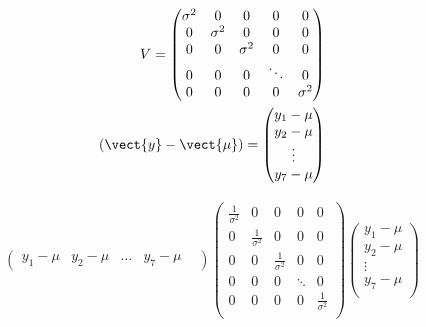 \documentclass[12pt,letterpaper,oneside]{article}\usepackage{graphicx, color}
\begin{document}

\begin{align*}
V=\begin{pmatrix}
    \sigma^{2} & 0 & 0 & 0      & 0\\
    0 & \sigma^{2} & 0 & 0      & 0\\
    0 & 0 & \sigma^{2} & 0      & 0\\
    0 & 0 & 0          & \ddots & 0\\
    0 & 0 & 0          &      0 & \sigma^{2}\\
\end{pmatrix}\\
(\vect{y}-\vect{\mu}) =
\begin{pmatrix}
    y_{1} -\mu\\
    y_{2} -\mu\\
    \vdots\\
    y_{7} -\mu\\
\end{pmatrix}\\
\end{align*}

\begin{align*}
    \begin{pmatrix}
    y_{1} -\mu &
    y_{2} -\mu &
    \ldots &
    y_{7} -\mu &
\end{pmatrix}
\begin{pmatrix}
    \frac{1}{\sigma^{2}} & 0 & 0 & 0      & 0\\
    0 & \frac{1}{\sigma^{2}} & 0 & 0      & 0\\
    0 & 0 & \frac{1}{\sigma^{2}} & 0      & 0\\
    0 & 0 & 0          & \ddots & 0\\
    0 & 0 & 0          &      0 & \frac{1}{\sigma^{2}}\\
\end{pmatrix}
\begin{pmatrix}
    y_{1} -\mu\\
    y_{2} -\mu\\
    \vdots\\
    y_{7} -\mu\\
\end{pmatrix}\\
\end{align*}
\end{document}
